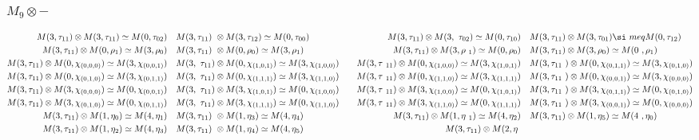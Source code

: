 \subsubsection{$M_9\otimes -$}
\begin{align*}
M(3,\tau_{11}) \otimes M(3,\tau_{11}) \simeq M(0,\tau_{02}) &&& M(3,\tau_{11})\
 \otimes M(3,\tau_{12}) \simeq M(0,\tau_{00}) &&& M(3,\tau_{11}) \otimes M(3,\
\tau_{02}) \simeq M(0,\tau_{10}) &&& M(3,\tau_{11}) \otimes M(3,\tau_{01}) \si\
meq M(0,\tau_{12})\\
M(3,\tau_{11}) \otimes M(0,\rho_{1}) \simeq M(3,\rho_{0}) &&& M(3,\tau_{11}) \
\otimes M(0,\rho_{0}) \simeq M(3,\rho_{1}) &&& M(3,\tau_{11}) \otimes M(3,\rho\
_{1}) \simeq M(0,\rho_{0}) &&& M(3,\tau_{11}) \otimes M(3,\rho_{0}) \simeq M(0\
,\rho_{1})\\
M(3,\tau_{11}) \otimes M(0,\chi_{(0,0,0)}) \simeq M(3,\chi_{(0,0,1)}) &&& M(3,\
\tau_{11}) \otimes M(0,\chi_{(1,0,1)}) \simeq M(3,\chi_{(1,0,0)}) &&& M(3,\tau\
_{11}) \otimes M(0,\chi_{(1,0,0)}) \simeq M(3,\chi_{(1,0,1)}) &&& M(3,\tau_{11\
}) \otimes M(0,\chi_{(0,1,1)}) \simeq M(3,\chi_{(0,1,0)})\\
M(3,\tau_{11}) \otimes M(0,\chi_{(0,1,0)}) \simeq M(3,\chi_{(0,1,1)}) &&& M(3,\
\tau_{11}) \otimes M(0,\chi_{(1,1,1)}) \simeq M(3,\chi_{(1,1,0)}) &&& M(3,\tau\
_{11}) \otimes M(0,\chi_{(1,1,0)}) \simeq M(3,\chi_{(1,1,1)}) &&& M(3,\tau_{11\
}) \otimes M(0,\chi_{(0,0,1)}) \simeq M(3,\chi_{(0,0,0)})\\
M(3,\tau_{11}) \otimes M(3,\chi_{(0,0,0)}) \simeq M(0,\chi_{(0,0,1)}) &&& M(3,\
\tau_{11}) \otimes M(3,\chi_{(1,0,1)}) \simeq M(0,\chi_{(1,0,0)}) &&& M(3,\tau\
_{11}) \otimes M(3,\chi_{(1,0,0)}) \simeq M(0,\chi_{(1,0,1)}) &&& M(3,\tau_{11\
}) \otimes M(3,\chi_{(0,1,1)}) \simeq M(0,\chi_{(0,1,0)})\\
M(3,\tau_{11}) \otimes M(3,\chi_{(0,1,0)}) \simeq M(0,\chi_{(0,1,1)}) &&& M(3,\
\tau_{11}) \otimes M(3,\chi_{(1,1,1)}) \simeq M(0,\chi_{(1,1,0)}) &&& M(3,\tau\
_{11}) \otimes M(3,\chi_{(1,1,0)}) \simeq M(0,\chi_{(1,1,1)}) &&& M(3,\tau_{11\
}) \otimes M(3,\chi_{(0,0,1)}) \simeq M(0,\chi_{(0,0,0)})\\
M(3,\tau_{11}) \otimes M(1,\eta_{0}) \simeq M(4,\eta_{1}) &&& M(3,\tau_{11}) \
\otimes M(1,\eta_{3}) \simeq M(4,\eta_{4}) &&& M(3,\tau_{11}) \otimes M(1,\eta\
_{1}) \simeq M(4,\eta_{2}) &&& M(3,\tau_{11}) \otimes M(1,\eta_{5}) \simeq M(4\
,\eta_{0})\\
M(3,\tau_{11}) \otimes M(1,\eta_{2}) \simeq M(4,\eta_{3}) &&& M(3,\tau_{11}) \
\otimes M(1,\eta_{4}) \simeq M(4,\eta_{5}) &&& M(3,\tau_{11}) \otimes M(2,\eta\

\end{align*}
